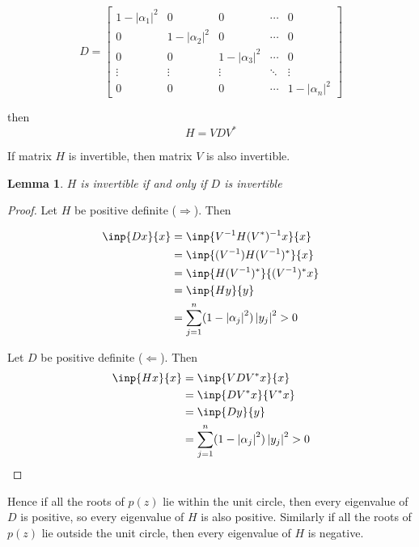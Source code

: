 \documentclass[twoside]{article}
\newcommand*\adj[1]{#1^*}
\newcommand*\abs[1]{\left \vert #1 \right\vert}
\theoremstyle{plain}
\newtheorem*{lemma}{Lemma}
\theoremstyle{definition}
\theoremstyle{remark}
\begin{document}
\[D = \begin{bmatrix} 1 - \abs{\alpha_1}^2 & 0 & 0 & \cdots & 0 \\
0 & 1 - \abs{\alpha_2}^2 & 0 & \cdots & 0 \\
0 & 0 & 1- \abs{\alpha_3}^2 & \cdots & 0 \\
\vdots & \vdots & \vdots & \ddots& \vdots \\
0 & 0 & 0 & \cdots & 1 - \abs{\alpha_n}^2 \end{bmatrix}\]

then 
\[H = V D \adj{V}\]

If matrix \(H\) is invertible, then matrix \(V\) is also invertible. 


\begin{lemma} \(H\) is invertible if and only if \(D\) is invertible \end{lemma}
\begin{proof}

Let \(H\) be positive definite (\(\Rightarrow\)). Then

\begin{equation*} \begin{split}
\inp{Dx}{x} & = \inp{V^{-1} H (\adj{V}) ^{-1}x}{x} \\
& = \inp{(V^{-1}) H \adj{(V^{-1})}}{x} \\
& = \inp{ H \adj{(V^{-1})}}{ \adj{(V^{-1})}x}\\
& = \inp{Hy}{y} \\
& = \sum_{j =1}^n (1 - \abs{\alpha_j}^2) \abs{y_j}^2 > 0\\
\end{split} \end{equation*} 


Let \(D\) be positive definite (\(\Leftarrow\)). Then 
\begin{equation*}\begin{split}
\inp{Hx}{x} & = \inp{VD\adj{V} x}{x} \\
& = \inp{D\adj{V} x}{\adj{V}x} \\
& = \inp{Dy}{y} \\
& = \sum_{j =1}^n (1 - \abs{\alpha_j}^2) \abs{y_j}^2 > 0
\end{split} \end{equation*}

\end{proof}

Hence if all the roots of \(p(z)\) lie within the unit circle, then every eigenvalue of \(D\) is positive, so every eigenvalue of \(H\) is also positive. 
Similarly if all the roots of \(p(z)\) lie outside the unit circle, then every eigenvalue of \(H\) is negative. 
\end{document}
